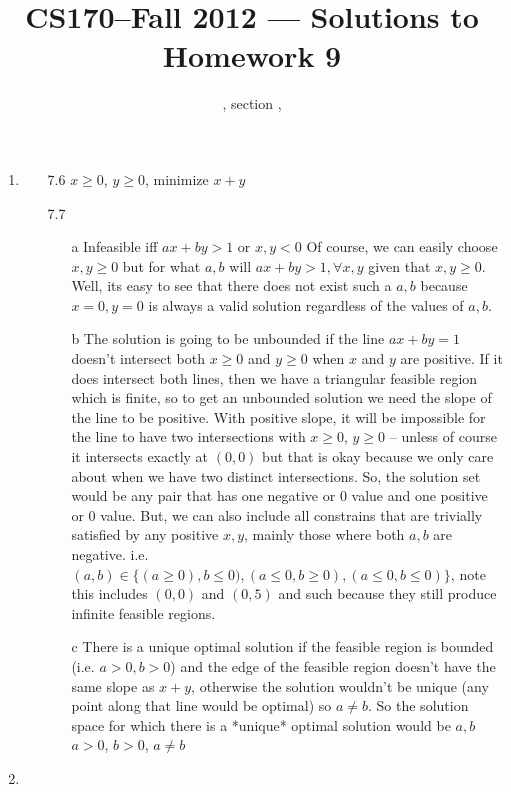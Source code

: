 \documentclass[11pt]{article}
\title{CS170--Fall 2012 --- Solutions to Homework 9}
\author{\Name, section \Sec, \texttt{\Login}}
\begin{document}
\maketitle
\begin{enumerate}
\item
\begin{enumerate}
\item[7.6] 	$x \ge 0$, $y \ge 0$, minimize $x+y$\\
\item[7.7]
\begin{enumerate}
\item[a] Infeasible iff $ax+by>1 $ or $x,y < 0$ Of course, we can easily choose $x,y\ge 0$ but for what $a,b$ will $ax+by>1, \forall x,y$ given that $x,y\ge 0$. Well, its easy to see that there does not exist such a $a,b$ because $x=0,y=0$ is always a valid solution regardless of the values of $a,b$.\\
\item[b] The solution is going to be unbounded if the line $ax+by=1$ doesn't intersect both $x\ge 0$ and $y\ge 0$ when $x$ and $y$ are positive. If it does intersect both lines, then we have a triangular feasible region which is finite, so to get an unbounded solution we need the slope of the line to be positive. With positive slope, it will be impossible for the line to have two intersections with $x\ge 0$, $y\ge 0$ -- unless of course it intersects exactly at $(0,0)$ but that is okay because we only care about when we have two distinct intersections. So, the solution set would be any pair that has one negative or $0$ value and one positive or $0$ value. But, we can also include all constrains that are trivially satisfied by any positive $x,y$, mainly those where both $a,b$ are negative. i.e. $(a,b)\in\{(a\ge 0),b\le 0), (a\le 0, b\ge 0), (a\le 0, b\le 0) \}$, note this includes $(0,0)$ and $(0,5)$ and such because they still produce infinite feasible regions. 
\item[c] There is a unique optimal solution if the feasible region is bounded (i.e. $a>0, b>0$) and the edge of the feasible region doesn't have the same slope as $x+y$, otherwise the solution wouldn't be unique (any point along that line would be optimal) so $a\neq b$. So the solution space for which there is a *unique* optimal solution would be $a,b$ $a>0$, $b>0$, $a\neq b$
\end{enumerate}
\end{enumerate}
\newpage
\item
\begin{enumerate}

\end{enumerate}
\end{enumerate}
\end{document}
